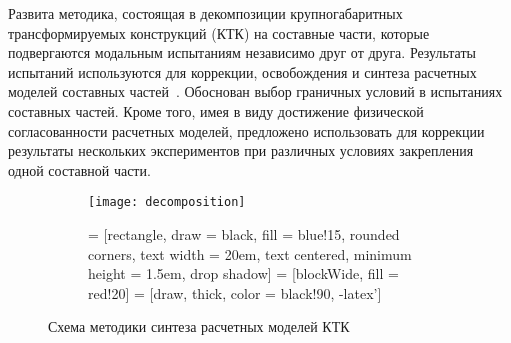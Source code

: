 Развита методика, состоящая в декомпозиции крупногабаритных трансформируемых конструкций (КТК) на составные части, которые подвергаются модальным испытаниям независимо друг от друга. Результаты испытаний используются для коррекции, освобождения и синтеза расчетных моделей составных частей~. Обоснован выбор граничных условий в испытаниях составных частей. Кроме того, имея в виду достижение физической согласованности расчетных моделей, предложено использовать для коррекции результаты нескольких экспериментов при различных условиях закрепления одной составной части.

\begin{figure}[!htb]
	\centering
	\begin{subfigure}[b]{0.45\textwidth}
		\texttt{[image: decomposition]}
	\end{subfigure}
	\hfill
	\begin{subfigure}[b]{0.45\textwidth}
         = [rectangle, draw = black, fill = blue!15, rounded corners, text width = 20em, text centered, minimum height = 1.5em, drop shadow] 
         = [blockWide, fill = red!20]
         = [draw, thick, color = black!90, -latex'] 
        \scriptsize 
        \def\nodeDist{0.3cm}
	\end{subfigure}
    \caption{Схема методики синтеза расчетных моделей КТК} \label{fig:schemeDecomposition}
    \vspace{1em}
\end{figure}  

